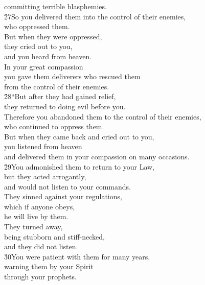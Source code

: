 \begin{poetry}
\poemlll       committing terrible blasphemies. \\
\poeml \v{27}So you delivered them into the control of their enemies, \\
\poemll    who oppressed them. \\
\poeml But when they were oppressed, \\
\poemll    they cried out to you, \\
\poemlll       and you heard from heaven. \\
\poeml In your great compassion \\
\poemll    you gave them deliverers who rescued them \\
\poemlll       from the control of their enemies. \\
\poeml \v{28}``But after they had gained relief, \\
\poemll    they returned to doing evil before you. \\
\poeml Therefore you abandoned them to the control of their enemies, \\
\poemll    who continued to oppress them. \\
\poeml But when they came back and cried out to you, \\
\poemll    you listened from heaven \\
\poemlll       and delivered them in your compassion on many occasions. \\
\poeml \v{29}You admonished them to return to your Law, \\
\poemll    but they acted arrogantly, \\
\poemlll       and would not listen to your commands. \\
\poeml They sinned against your regulations, \\
\poemll    which if anyone obeys, \\
\poemlll       he will live by them. \\
\poeml They turned away, \\
\poemll    being stubborn and stiff-necked, \\
\poemlll       and they did not listen. \\
\poeml \v{30}You were patient with them for many years, \\
\poemll    warning them by your Spirit \\
\poemlll       through your prophets. \\

\end{poetry}
